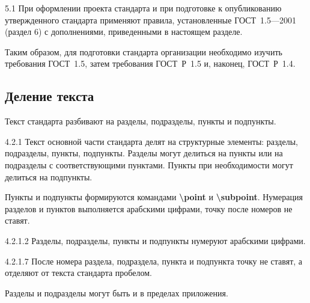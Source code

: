 \documentclass[12pt, twoside, final]{ruost}
\newcommand{\txtcmd}[1]{\textbf{\backslash{}#1}}
\begin{document}
\begin{OST}
					\begin{stdquote}
						\par 5.1 При оформлении проекта стандарта и при подготовке к опубликованию утвержденного стандарта применяют правила, установленные ГОСТ~1.5—2001 (раздел 6) с дополнениями, приведенными в настоящем разделе.
						\par [ГОСТ Р 1.5---2012]
					\end{stdquote}
					
				\point Таким образом, для подготовки стандарта организации необходимо изучить требования ГОСТ~1.5, затем требования ГОСТ~Р~1.5 и, наконец, ГОСТ~Р~1.4.
				
			\subsection{Деление текста}
				
				\point Текст стандарта разбивают на разделы, подразделы, пункты и подпункты.
				
					\begin{stdquote}
						\par 4.2.1 Текст основной части стандарта делят на структурные элементы: разделы, подразделы, пункты, подпункты. Разделы могут делиться на пункты или на подразделы с соответствующими пунктами. Пункты при необходимости могут делиться на подпункты.
						\par [ГОСТ 1.5---2001]
					\end{stdquote}
				
				\point Пункты и подпункты формируются командами \txtcmd{point} и \txtcmd{subpoint}.
				\point Нумерация разделов и пунктов выполняется арабскими цифрами, точку после номеров не ставят.
				
					\begin{stdquote}
						\par 4.2.1.2 Разделы, подразделы, пункты и подпункты нумеруют арабскими цифрами.
						\par [ГОСТ 1.5---2001]
					\end{stdquote}
					
					\begin{stdquote}
						\par 4.2.1.7 После номера раздела, подраздела, пункта и подпункта точку не ставят, а отделяют от текста стандарта пробелом.
						\par [ГОСТ 1.5---2001]
					\end{stdquote}
					
				\point\label{pnt:appendixsections} Разделы и подразделы могут быть и в пределах приложения.
				

\end{OST}
\end{document}
